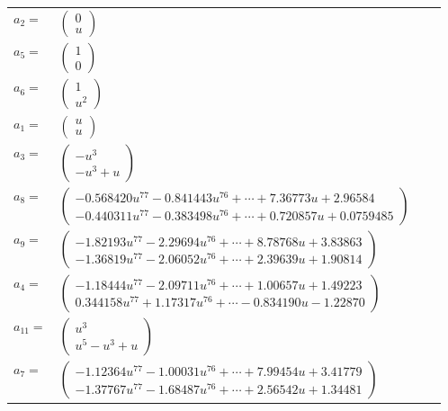 \documentclass[1p]{elsarticle_modified}
\theoremstyle{definition}
\begin{document}
\begin{tabular}{m{7pt} m{180pt} m{7pt} m{180pt} }
\flushright $a_{2}=$&$\begin{pmatrix}0\\u\end{pmatrix}$ \\
\flushright $a_{5}=$&$\begin{pmatrix}1\\0\end{pmatrix}$ \\
\flushright $a_{6}=$&$\begin{pmatrix}1\\u^2\end{pmatrix}$ \\
\flushright $a_{1}=$&$\begin{pmatrix}u\\u\end{pmatrix}$ \\
\flushright $a_{3}=$&$\begin{pmatrix}- u^3\\- u^3+u\end{pmatrix}$ \\
\flushright $a_{8}=$&$\begin{pmatrix}-0.568420 u^{77}-0.841443 u^{76}+\cdots+7.36773 u+2.96584\\-0.440311 u^{77}-0.383498 u^{76}+\cdots+0.720857 u+0.0759485\end{pmatrix}$ \\
\flushright $a_{9}=$&$\begin{pmatrix}-1.82193 u^{77}-2.29694 u^{76}+\cdots+8.78768 u+3.83863\\-1.36819 u^{77}-2.06052 u^{76}+\cdots+2.39639 u+1.90814\end{pmatrix}$ \\
\flushright $a_{4}=$&$\begin{pmatrix}-1.18444 u^{77}-2.09711 u^{76}+\cdots+1.00657 u+1.49223\\0.344158 u^{77}+1.17317 u^{76}+\cdots-0.834190 u-1.22870\end{pmatrix}$ \\
\flushright $a_{11}=$&$\begin{pmatrix}u^3\\u^5- u^3+u\end{pmatrix}$ \\
\flushright $a_{7}=$&$\begin{pmatrix}-1.12364 u^{77}-1.00031 u^{76}+\cdots+7.99454 u+3.41779\\-1.37767 u^{77}-1.68487 u^{76}+\cdots+2.56542 u+1.34481\end{pmatrix}$ \\

\end{tabular}
\end{document}
